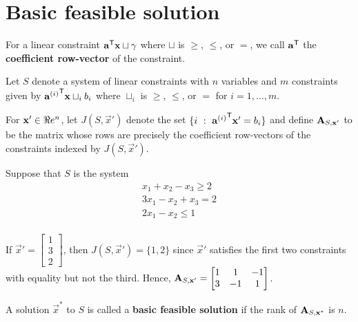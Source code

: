 %


\section{Basic feasible solution}\label{basic-feasible-solution}

For a linear constraint \(\mathbf{a}^{\mathsf{T}} \mathbf{x} \sqcup \gamma\) where
\(\sqcup\) is \(\geq\), \(\leq\), or \(=\), we call \(\mathbf{a}^{\mathsf{T}}\) the
\textbf{coefficient row-vector} of the constraint.

Let \(S\) denote a system of linear constraints with \(n\) variables and
\(m\) constraints given by \({\mathbf{a}^{(i)}}^{\mathsf{T}} \mathbf{x} \sqcup_i b_i\)
where \(\sqcup_i\) is \(\geq\), \(\leq\), or \(=\) for
\(i = 1,\ldots, m\).

For \(\mathbf{x}' \in \Re e^n\), let \(J(S,\vec{x}')\) denote the set
\(\{ i ~:~ {\mathbf{a}^{(i)}}^{\mathsf{T}} \mathbf{x}' = b_i\}\) and define
\(\mathbf{A}_{S,\mathbf{x}'}\) to be the matrix whose rows are precisely the
coefficient row-vectors of the constraints indexed by \(J(S,\vec{x}')\).

\begin{example}{}{}
\protect\hypertarget{ex:bfs-ex}{}{\label{ex:bfs-ex}} Suppose that \(S\) is
the system
\begin{align*}
  x_1 + x_2 - x_3 \geq 2 \\
 3x_1 - x_2 + x_3 = 2 \\
 2x_1 - x_2  \leq 1 \\
\end{align*}

If \(\vec{x}' = \begin{bmatrix} 1 \\ 3 \\ 2\end{bmatrix}\), then
\(J(S,\vec{x}') = \{1,2\}\) since \(\vec{x}'\) satisfies the first two
constraints with equality but not the third. Hence,
\(\mathbf{A}_{S,\mathbf{x}'} = \begin{bmatrix} 1 & 1 & -1 \\ 3 & -1 & 1 \end{bmatrix}\).
\end{example}

\begin{definition}{}{}
\protect\hypertarget{def:unnamed-chunk-4}{}{\label{def:unnamed-chunk-4}}A
solution \(\vec{x}^*\) to \(S\) is called a \textbf{basic feasible
solution} if the rank of \(\mathbf{A}_{S,\mathbf{x}^*}\) is \(n\).
\end{definition}

